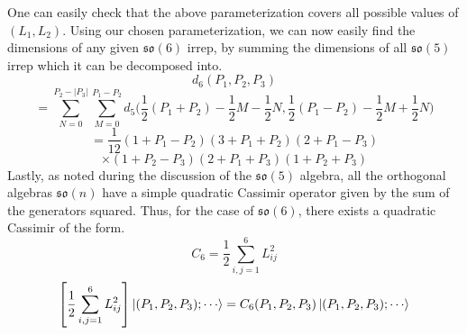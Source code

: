 \newpage
One can easily check that the above parameterization covers all possible values of $(L_1,L_2)$. Using our chosen parameterization, we can now easily find the dimensions of any given $\mathfrak{so}(6)$ irrep, by summing the dimensions of all $\mathfrak{so}(5)$ irrep which it can be decomposed into.
%
%
\begin{equation*}
d_6(P_1,P_2,P_3)
\end{equation*}
%
%
\begin{equation*}
=
\sum_{N=0}^{P_2-|P_3|}
\sum_{M=0}^{P_1-P_2}
d_5 \Bigg(
\frac{1}{2} (P_1 + P_2) - \frac{1}{2} M - \frac{1}{2} N,
\frac{1}{2} (P_1 - P_2) - \frac{1}{2} M + \frac{1}{2} N
\Bigg)
\end{equation*}
%
%
\begin{equation*}
=
\frac{1}{12}
(1 + P_1 - P_2)
(3 + P_1 + P_2)
(2 + P_1 - P_3)
\end{equation*}
%
%
\begin{equation}
\times
(1 + P_2 - P_3)
(2 + P_1 + P_3)
(1 + P_2 + P_3)
\end{equation}
%
%
%
%
Lastly, as noted during the discussion of the $\mathfrak{so}(5)$ algebra, all the orthogonal algebras $\mathfrak{so}(n)$ have a simple quadratic Cassimir operator given by the sum of the generators squared. Thus, for the case of $\mathfrak{so}(6)$, there exists a quadratic Cassimir of the form.
%
%
\begin{equation}
C_6 = \frac{1}{2} \sum_{i,j=1}^6 L_{ij}^2
\end{equation}
%
%
\begin{equation}
\left[
\frac{1}{2} \sum_{i,j=1}^6 L_{ij}^2
\right] \ket{(P_1,P_2,P_3);\cdots}
=
C_6(P_1,P_2,P_3) \ket{(P_1,P_2,P_3);\cdots}
\end{equation}
